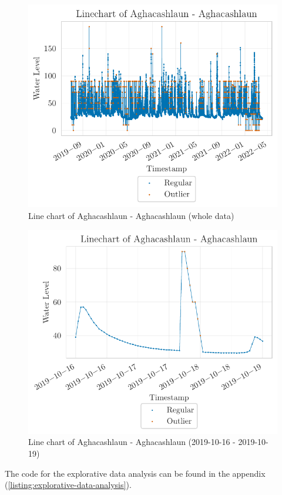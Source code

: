 \begin{figure}[htp]
    \centering
    \includegraphics{./plots/pdfs/36022-ie/linechart_36022-ie.pdf}
    \caption{Line chart of Aghacashlaun - Aghacashlaun (whole data)}
    \label{figure:linechart-36022-ie}
\end{figure}
\begin{figure}[htp]
    \centering
    \includegraphics{./plots/pdfs/36022-ie/slice_linechart_36022-ie.pdf}
    \caption{Line chart  of Aghacashlaun - Aghacashlaun (2019-10-16 - 2019-10-19)}
    \label{figure:linechart-zoomed-36022-ie}
\end{figure}
\newline
The code for the explorative data analysis can be found in the appendix (\autoref{listing:explorative-data-analysis}).
\clearpage

